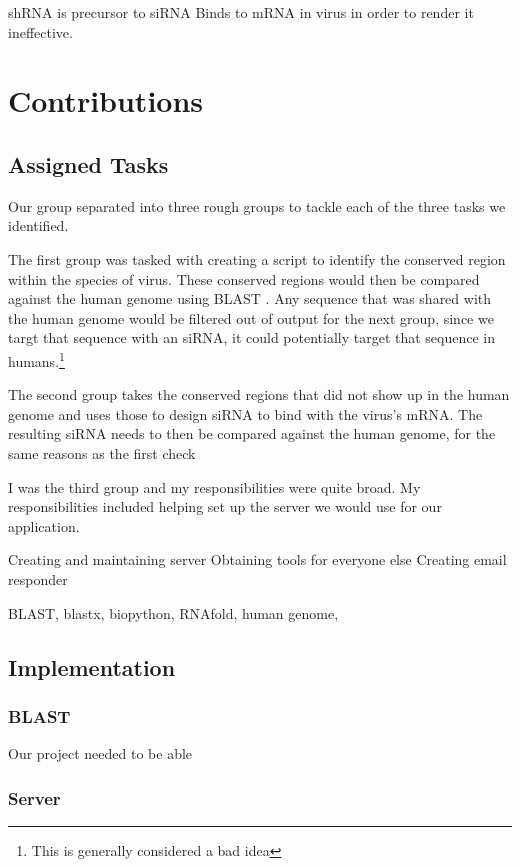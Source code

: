 \documentclass[10pt,letterpaper]{article}
\begin{document}
shRNA is precursor to siRNA
Binds to mRNA in virus in order to render it ineffective.


\section{Contributions}




\subsection{Assigned Tasks}
Our group separated into three rough groups to tackle each of the three tasks we identified.

The first group was tasked with creating a script to identify the conserved region within the species of virus.
These conserved regions would then be compared against the human genome using BLAST \cite{blast}.
Any sequence that was shared with the human genome would be filtered out of output for the next group, since we targt that sequence with an siRNA, it could potentially target that sequence in humans.\footnote{This is generally considered a bad idea}

The second group takes the conserved regions that did not show up in the human genome and uses those to design siRNA to bind with the virus's mRNA.
The resulting siRNA needs to then be compared against the human genome, for the same reasons as the first check

I was the third group and my responsibilities were quite broad.
My responsibilities included helping set up the server we would use for our application.


Creating and maintaining server
Obtaining tools for everyone else
Creating email responder


BLAST, blastx, biopython, RNAfold, human genome,

\subsection{Implementation}




\subsubsection{BLAST}

Our project needed to be able 


\subsubsection{Server}
\end{document}
